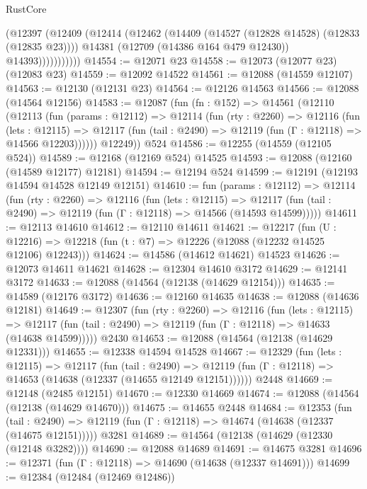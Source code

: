 \begin{lexlean}{RustCore}
\begin{coremodule}
                  (@12397
                    (@12409
                      (@12414
                        (@12462
                          (@14409 (@14527 (@12828 @14528) (@12833 (@12835 @23))))
                          @14381
                          (@12709 (@14386 @164 @479 @12430))
                          @14393)))))))))))
@14554 := @12071 @23
@14558 := @12073 (@12077 @23) (@12083 @23)
@14559 := @12092 @14522
@14561 := @12088 (@14559 @12107)
@14563 := @12130 (@12131 @23)
@14564 := @12126 @14563
@14566 := @12088 (@14564 @12156)
@14583 := @12087
    (fun (fn : @152) =>
    @14561
      (@12110
        (@12113
          (fun (params : @12112) =>
          @12114
            (fun (rty : @2260) =>
            @12116
              (fun (lets : @12115) =>
              @12117 (fun (tail : @2490) => @12119 (fun (Γ : @12118) => @14566 @12203))))))
        @12249))
    @524
@14586 := @12255 (@14559 (@12105 @524))
@14589 := @12168 (@12169 @524) @14525
@14593 := @12088 (@12160 (@14589 @12177) @12181)
@14594 := @12194 @524
@14599 := @12191 (@12193 @14594 @14528 @12149 @12151)
@14610 := fun (params : @12112) =>
  @12114
    (fun (rty : @2260) =>
    @12116
      (fun (lets : @12115) =>
      @12117 (fun (tail : @2490) => @12119 (fun (Γ : @12118) => @14566 (@14593 @14599)))))
@14611 := @12113 @14610
@14612 := @12110 @14611
@14621 := @12217
    (fun (U : @12216) => @12218 (fun (t : @7) => @12226 (@12088 (@12232 @14525 @12106) @12243)))
@14624 := @14586 (@14612 @14621) @14523
@14626 := @12073 @14611 @14621
@14628 := @12304 @14610 @3172
@14629 := @12141 @3172
@14633 := @12088 (@14564 (@12138 (@14629 @12154)))
@14635 := @14589 (@12176 @3172)
@14636 := @12160 @14635
@14638 := @12088 (@14636 @12181)
@14649 := @12307
    (fun (rty : @2260) =>
    @12116
      (fun (lets : @12115) =>
      @12117 (fun (tail : @2490) => @12119 (fun (Γ : @12118) => @14633 (@14638 @14599)))))
    @2430
@14653 := @12088 (@14564 (@12138 (@14629 @12331)))
@14655 := @12338 @14594 @14528
@14667 := @12329
    (fun (lets : @12115) =>
    @12117
      (fun (tail : @2490) =>
      @12119 (fun (Γ : @12118) => @14653 (@14638 (@12337 (@14655 @12149 @12151))))))
    @2448
@14669 := @12148 (@2485 @12151)
@14670 := @12330 @14669
@14674 := @12088 (@14564 (@12138 (@14629 @14670)))
@14675 := @14655 @2448
@14684 := @12353
    (fun (tail : @2490) => @12119 (fun (Γ : @12118) => @14674 (@14638 (@12337 (@14675 @12151)))))
    @3281
@14689 := @14564 (@12138 (@14629 (@12330 (@12148 @3282))))
@14690 := @12088 @14689
@14691 := @14675 @3281
@14696 := @12371 (fun (Γ : @12118) => @14690 (@14638 (@12337 @14691)))
@14699 := @12384 (@12484 (@12469 @12486))

\end{coremodule}
\end{lexlean}

